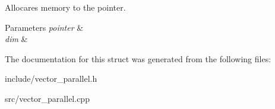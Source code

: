 Allocares memory to the pointer. 


\begin{DoxyParams}{Parameters}
{\em pointer} & \\
\hline
{\em dim} & \\
\hline
\end{DoxyParams}


The documentation for this struct was generated from the following files\+:\begin{DoxyCompactItemize}
\item 
include/vector\+\_\+parallel.\+h\item 
src/vector\+\_\+parallel.\+cpp\end{DoxyCompactItemize}
